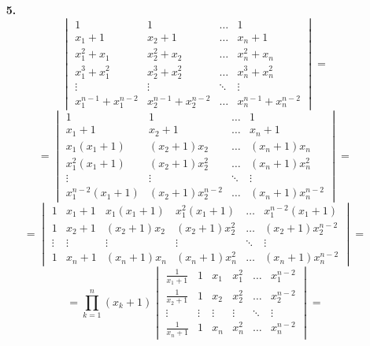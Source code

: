\documentclass[a4paper]{article}
\renewcommand{\det}[1]{\begin{vmatrix} #1 \end{vmatrix}}
\renewcommand{\f}[2]{\frac{#1}{#2}}
\newcommand{\mul}[2]{\prod_{#1}^{#2}}
\begin{document}
\begin{enumerate}
    \item[\textbf{5.}]$$\det{1 & 1 & \dots & 1 \\
    x_1 + 1 & x_2 + 1 & \dots & x_n + 1 \\
    x_1^2 + x_1 & x_2^2 + x_2 & \dots & x_n^2 + x_n \\
    x_1^3 + x_1^2 & x_2^3 + x_2^2 & \dots & x_n^3 + x_n^2 \\
    \vdots & \vdots & \ddots & \vdots \\
    x_1^{n-1} + x_1^{n-2} & x_2^{n-1} + x_2^{n-2} & \dots & x_n^{n-1} + x_n^{n-2}}= $$
    $$=\det{1 & 1 & \dots & 1 \\
    x_1 + 1 & x_2 + 1 & \dots & x_n + 1 \\
    x_1(x_1 + 1) & (x_2 + 1)x_2 & \dots & (x_n + 1)x_n \\
    x_1^2(x_1 + 1) & (x_2 + 1)x_2^2 & \dots & (x_n + 1)x_n^2 \\
    \vdots & \vdots & \ddots & \vdots \\
    x_1^{n-2}(x_1 + 1) & (x_2 + 1)x_2^{n-2} & \dots & (x_n + 1)x_n^{n-2}} = $$
    $$= \det{1 & x_1 + 1 & x_1(x_1 + 1) & x_1^2(x_1 + 1) & \dots & x_1^{n-2}(x_1 + 1) \\
    1 & x_2 + 1 & (x_2 + 1)x_2 & (x_2 + 1)x_2^2 & \dots & (x_2 + 1)x_2^{n-2} \\
    \vdots & \vdots & \vdots & \vdots & \ddots & \vdots \\
    1 & x_n + 1 & (x_n + 1)x_n & (x_n + 1)x_n^2 & \dots & (x_n + 1)x_n^{n-2}} =$$
    $$= \mul{k=1}{n}(x_k+1) \det{\f{1}{x_1 + 1} & 1 & x_1 & x_1^2 & \dots & x_1^{n-2} \\
    \f{1}{x_2 + 1} & 1 & x_2 & x_2^2 & \dots & x_2^{n-2} \\
    \vdots & \vdots & \vdots & \vdots & \ddots & \vdots \\
    \f{1}{x_n + 1} & 1 & x_n & x_n^2 & \dots & x_n^{n-2}} = $$


\end{enumerate}
\end{document}
